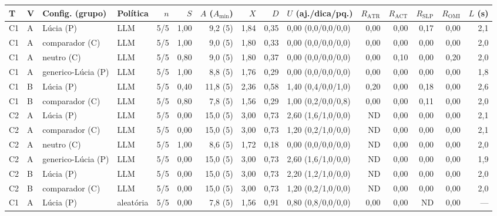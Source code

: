 \begin{tabular}{@{}llllrrrrrlrrrrr@{}}
\toprule
\textbf{T} & \textbf{V} & \textbf{Config. (grupo)} & \textbf{Política} & \textbf{$n$} & \textbf{$S$} & \textbf{$A$ ($A_{\min}$)} & \textbf{$X$} & \textbf{$D$} & \textbf{$U$ (aj./dica/pq.)} & \textbf{$R_{\mathrm{ATR}}$} & \textbf{$R_{\mathrm{ACT}}$} & \textbf{$R_{\mathrm{SLP}}$} & \textbf{$R_{\mathrm{OMI}}$} & \textbf{$L$ (s)} \\
\midrule
C1 & A & Lúcia (P) & LLM & 5/5 & 1,00 & 9,2 (5) & 1,84 & 0,35 & 0,00 (0,0/0,0/0,0) & 0,00 & 0,00 & 0,17 & 0,00 & 2,1 \\
C1 & A & comparador (C) & LLM & 5/5 & 1,00 & 9,0 (5) & 1,80 & 0,33 & 0,00 (0,0/0,0/0,0) & 0,00 & 0,00 & 0,00 & 0,00 & 2,0 \\
C1 & A & neutro (C) & LLM & 5/5 & 0,80 & 9,0 (5) & 1,80 & 0,37 & 0,00 (0,0/0,0/0,0) & 0,00 & 0,10 & 0,00 & 0,20 & 2,0 \\
C1 & A & generico-Lúcia (P) & LLM & 5/5 & 1,00 & 8,8 (5) & 1,76 & 0,29 & 0,00 (0,0/0,0/0,0) & 0,00 & 0,00 & 0,00 & 0,00 & 1,8 \\
C1 & B & Lúcia (P) & LLM & 5/5 & 0,40 & 11,8 (5) & 2,36 & 0,58 & 1,40 (0,4/0,0/1,0) & 0,20 & 0,00 & 0,18 & 0,00 & 2,6 \\
C1 & B & comparador (C) & LLM & 5/5 & 0,80 & 7,8 (5) & 1,56 & 0,29 & 1,00 (0,2/0,0/0,8) & 0,00 & 0,00 & 0,11 & 0,00 & 2,0 \\
C2 & A & Lúcia (P) & LLM & 5/5 & 0,00 & 15,0 (5) & 3,00 & 0,73 & 2,60 (1,6/1,0/0,0) & ND & 0,00 & 0,00 & 0,00 & 2,1 \\
C2 & A & comparador (C) & LLM & 5/5 & 0,00 & 15,0 (5) & 3,00 & 0,73 & 1,20 (0,2/1,0/0,0) & ND & 0,00 & 0,00 & 0,00 & 2,1 \\
C2 & A & neutro (C) & LLM & 5/5 & 1,00 & 8,6 (5) & 1,72 & 0,18 & 0,00 (0,0/0,0/0,0) & ND & 0,00 & 0,00 & 0,00 & 2,0 \\
C2 & A & generico-Lúcia (P) & LLM & 5/5 & 0,00 & 15,0 (5) & 3,00 & 0,73 & 2,60 (1,6/1,0/0,0) & ND & 0,00 & 0,00 & 0,00 & 1,9 \\
C2 & B & Lúcia (P) & LLM & 5/5 & 0,00 & 15,0 (5) & 3,00 & 0,73 & 2,20 (1,2/1,0/0,0) & ND & 0,00 & 0,00 & 0,00 & 2,0 \\
C2 & B & comparador (C) & LLM & 5/5 & 0,00 & 15,0 (5) & 3,00 & 0,73 & 1,20 (0,2/1,0/0,0) & ND & 0,00 & 0,00 & 0,00 & 2,0 \\
C1 & A & Lúcia (P) & aleatória & 5/5 & 0,00 & 7,8 (5) & 1,56 & 0,91 & 0,80 (0,8/0,0/0,0) & 0,00 & 0,00 & ND & 0,00 & --- \\

\end{tabular}

